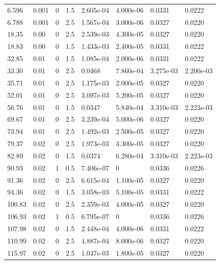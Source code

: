 \documentclass[preview]{standalone}
\begin{document}
{{\begin{tabular}{L{1.2cm}C{1.2cm} C{0.3cm}C{0.5cm} C{1.4cm}C{1.4cm} C{1.4cm}C{1.4cm}}
  6.596  &  0.001  & 0     & 1.5 &  2.605e-04  & 4.000e-06  & 0.0331 &  0.0222   \\ 
  6.788  &  0.001  & 0     & 2.5 &  1.567e-04  & 3.000e-06  & 0.0327 &  0.0220   \\ 
  18.35  &  0.00  & 0     & 2.5 &  2.539e-03  & 4.300e-05  & 0.0327 &  0.0220   \\ 
  18.83  &  0.00  & 0     & 1.5 &  1.433e-03  & 2.400e-05  & 0.0331 &  0.0222   \\ 
  32.85  &  0.01  & 0     & 1.5 &  1.085e-04  & 2.000e-06  & 0.0331 &  0.0222   \\ 
  33.30  &  0.01  & 0     & 2.5 &  0.0468  & 7.860e-04  & 3.275e-03 &  2.200e-03   \\ 
  35.71  &  0.01  & 0     & 2.5 &  1.175e-03  & 2.000e-05  & 0.0327 &  0.0220   \\ 
  52.01  &  0.01  & 0     & 2.5 &  3.097e-03  & 5.200e-05  & 0.0327 &  0.0220   \\ 
  56.76  &  0.01  & 0     & 1.5 &  0.0347  & 5.840e-04  & 3.310e-03 &  2.223e-03   \\ 
  69.67  &  0.01  & 0     & 2.5 &  3.239e-04  & 5.000e-06  & 0.0327 &  0.0220   \\ 
  73.94  &  0.01  & 0     & 2.5 &  1.492e-03  & 2.500e-05  & 0.0327 &  0.0220   \\ 
  79.37  &  0.02  & 0     & 2.5 &  1.973e-03  & 3.300e-05  & 0.0327 &  0.0220   \\ 
  82.89  &  0.02  & 0     & 1.5 &  0.0374  & 6.280e-04  & 3.310e-03 &  2.223e-03   \\ 
  90.93  &  0.02  & 1     & 0.5 &  7.406e-07  & 0  & 0.0336 &  0.0226   \\ 
  91.36  &  0.02  & 0     & 2.5 &  6.615e-04  & 1.100e-05  & 0.0327 &  0.0220   \\ 
  94.36  &  0.02  & 0     & 1.5 &  3.058e-03  & 5.100e-05  & 0.0331 &  0.0222   \\ 
  100.83  &  0.02  & 0     & 2.5 &  2.359e-03  & 4.000e-05  & 0.0327 &  0.0220   \\ 
  106.93  &  0.02  & 1     & 0.5 &  6.795e-07  & 0  & 0.0336 &  0.0226   \\ 
  107.98  &  0.02  & 0     & 1.5 &  2.448e-04  & 4.000e-06  & 0.0331 &  0.0222   \\ 
  110.99  &  0.02  & 0     & 2.5 &  4.887e-04  & 8.000e-06  & 0.0327 &  0.0220   \\ 
  115.97  &  0.02  & 0     & 2.5 &  1.047e-03  & 1.800e-05  & 0.0327 &  0.0220   \\ 

\end{tabular}}}
\end{document}
